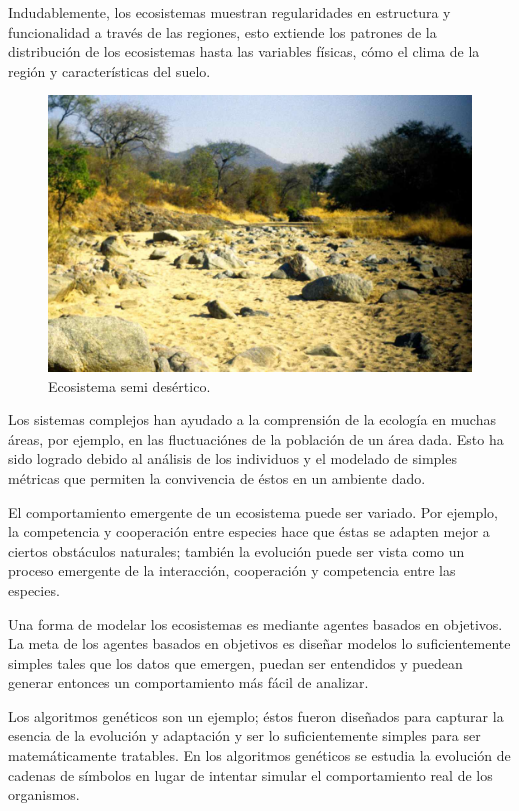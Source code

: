       Indudablemente, los ecosistemas muestran regularidades en estructura y funcionalidad a través de las regiones, esto extiende los patrones de la distribución de los ecosistemas hasta las variables físicas, cómo el clima de la región y características del suelo. \cite{7}

      \begin{figure}[h!]
        \centering
          \includegraphics[width=\textwidth]{./images/Ecosistema}
          \caption{Ecosistema semi desértico.} 
      \end{figure}

      Los sistemas complejos han ayudado a la comprensión de la ecología en muchas áreas, por ejemplo, en las fluctuaciónes de la población de un área dada. Esto ha sido logrado debido al análisis de los individuos y el modelado de simples métricas que permiten la convivencia de éstos en un ambiente dado.

      El comportamiento emergente de un ecosistema puede ser variado. Por ejemplo, la competencia y cooperación entre especies hace que éstas se adapten mejor a ciertos obstáculos naturales; también la evolución puede ser vista como un proceso emergente de la interacción, cooperación y competencia entre las especies.

      Una forma de modelar los ecosistemas es mediante agentes basados en objetivos. La meta de los agentes basados en objetivos es diseñar modelos lo suficientemente simples tales que los datos que emergen, puedan ser entendidos y puedean generar entonces un comportamiento más fácil de analizar.

      Los algoritmos genéticos son un ejemplo; éstos fueron diseñados para capturar la esencia de la evolución y adaptación y ser lo suficientemente simples para ser matemáticamente tratables. En los algoritmos genéticos se estudia la evolución de cadenas de símbolos en lugar de intentar simular el comportamiento real de los organismos. \cite{8}